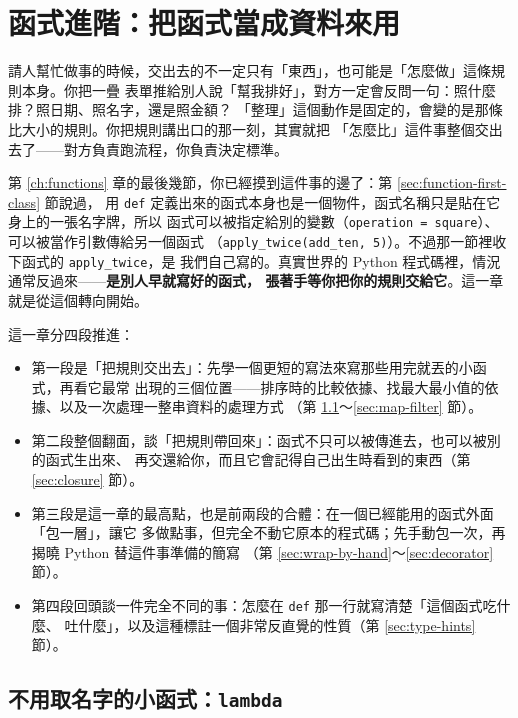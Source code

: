 \chapter{函式進階：把函式當成資料來用}
\label{ch:advanced-functions}

請人幫忙做事的時候，交出去的不一定只有「東西」，也可能是「怎麼做」這條規則本身。你把一疊
表單推給別人說「幫我排好」，對方一定會反問一句：照什麼排？照日期、照名字，還是照金額？
「整理」這個動作是固定的，會變的是那條比大小的規則。你把規則講出口的那一刻，其實就把
「怎麼比」這件事整個交出去了——對方負責跑流程，你負責決定標準。

第 \ref{ch:functions} 章的最後幾節，你已經摸到這件事的邊了：第 \ref{sec:function-first-class} 節說過，
用 \texttt{def} 定義出來的函式本身也是一個物件，函式名稱只是貼在它身上的一張名字牌，所以
函式可以被指定給別的變數（\texttt{operation = square}）、可以被當作引數傳給另一個函式
（\texttt{apply\_twice(add\_ten, 5)}）。不過那一節裡收下函式的 \texttt{apply\_twice}，是
我們自己寫的。真實世界的 Python 程式碼裡，情況通常反過來——\textbf{是別人早就寫好的函式，
張著手等你把你的規則交給它}。這一章就是從這個轉向開始。

這一章分四段推進：

\begin{itemize}
\item 第一段是「把規則交出去」：先學一個更短的寫法來寫那些用完就丟的小函式，再看它最常
出現的三個位置——排序時的比較依據、找最大最小值的依據、以及一次處理一整串資料的處理方式
（第 \ref{sec:lambda}～\ref{sec:map-filter} 節）。
\item 第二段整個翻面，談「把規則帶回來」：函式不只可以被傳進去，也可以被別的函式生出來、
再交還給你，而且它會記得自己出生時看到的東西（第 \ref{sec:closure} 節）。
\item 第三段是這一章的最高點，也是前兩段的合體：在一個已經能用的函式外面「包一層」，讓它
多做點事，但完全不動它原本的程式碼；先手動包一次，再揭曉 Python 替這件事準備的簡寫
（第 \ref{sec:wrap-by-hand}～\ref{sec:decorator} 節）。
\item 第四段回頭談一件完全不同的事：怎麼在 \texttt{def} 那一行就寫清楚「這個函式吃什麼、
吐什麼」，以及這種標註一個非常反直覺的性質（第 \ref{sec:type-hints} 節）。
\end{itemize}

\section{不用取名字的小函式：\texttt{lambda}}
\label{sec:lambda}

